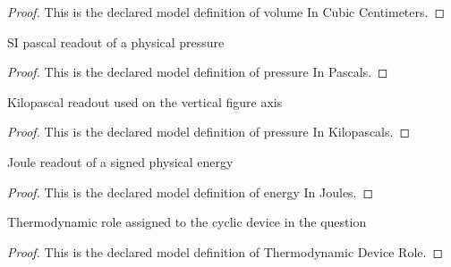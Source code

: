 \begin{proof}
  This is the declared model definition of volume In Cubic Centimeters.
\end{proof}
\begin{definition}
  \label{def:physics:phyx-mini-0421:phyxminiproblems-problemphyxmini0421-pressureinpascals}
  SI pascal readout of a physical pressure
\end{definition}
\begin{proof}
  This is the declared model definition of pressure In Pascals.
\end{proof}
\begin{definition}
  \label{def:physics:phyx-mini-0421:phyxminiproblems-problemphyxmini0421-pressureinkilopascals}
  Kilopascal readout used on the vertical figure axis
\end{definition}
\begin{proof}
  This is the declared model definition of pressure In Kilopascals.
\end{proof}
\begin{definition}
  \label{def:physics:phyx-mini-0421:phyxminiproblems-problemphyxmini0421-energyinjoules}
  Joule readout of a signed physical energy
\end{definition}
\begin{proof}
  This is the declared model definition of energy In Joules.
\end{proof}
\begin{definition}
  \label{def:physics:phyx-mini-0421:phyxminiproblems-problemphyxmini0421-thermodynamicdevicerole}
  Thermodynamic role assigned to the cyclic device in the question
\end{definition}
\begin{proof}
  This is the declared model definition of Thermodynamic Device Role.
\end{proof}
